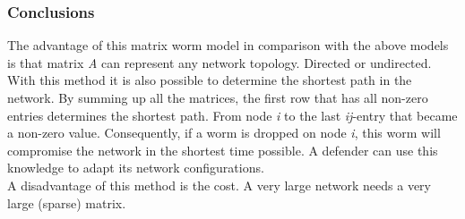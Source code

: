 \subsubsection*{Conclusions}
The advantage of this matrix worm model in comparison with the above models is that matrix  \textit{A} can represent any network topology. Directed or undirected. \\
With this method it is also possible to determine the shortest path in the network. By summing up all the matrices, the first row that has all non-zero entries determines the shortest path. From node \textit{i} to the last \textit{ij}-entry that became a non-zero value. Consequently, if a worm is dropped on node \textit{i}, this worm will compromise the network in the shortest time possible. A defender can use this knowledge to adapt its network configurations. \\
A disadvantage of this method is the cost. A very large network needs a very large (sparse) matrix. 
%
%


